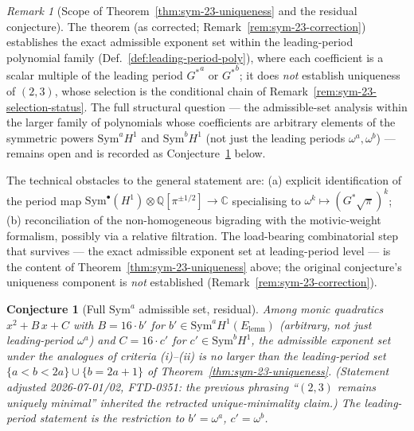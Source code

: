 \documentclass[11pt]{article}
\newtheorem{conjecture}[theorem]{Conjecture}
\theoremstyle{definition}
\theoremstyle{remark}
\newtheorem*{remark}{Remark}
\newcommand{\Gs}{G^{*}}
\newcommand{\Q}{\mathbb{Q}}
\newcommand{\C}{\mathbb{C}}
\begin{document}
\begin{remark}[Scope of Theorem~\ref{thm:sym-23-uniqueness} and the residual conjecture]
\label{rem:sym-thm-scope}
The theorem (as corrected; Remark~\ref{rem:sym-23-correction})
establishes the exact admissible exponent set within the
leading-period polynomial family (Def.~\ref{def:leading-period-poly}),
where each coefficient is a scalar multiple of the leading period
${\Gs}^{a}$ or ${\Gs}^{b}$; it does \emph{not} establish uniqueness of
$(2, 3)$, whose selection is the conditional chain of
Remark~\ref{rem:sym-23-selection-status}. The full structural
question --- the admissible-set analysis within the larger family of
polynomials whose coefficients are arbitrary elements of the symmetric
powers $\mathrm{Sym}^{a} H^{1}$ and $\mathrm{Sym}^{b} H^{1}$ (not just
the leading periods $\omega^{a}, \omega^{b}$) --- remains open and is
recorded as Conjecture~\ref{conj:sym-general} below.

The technical obstacles to the general statement are:
(a) explicit identification of the period map
$\mathrm{Sym}^{\bullet}(H^{1}) \otimes \Q[\pi^{\pm 1/2}] \to \C$
specialising to $\omega^{k} \mapsto (\Gs\sqrt\pi)^{k}$;
(b) reconciliation of the non-homogeneous bigrading with the
motivic-weight formalism, possibly via a relative filtration.
The load-bearing combinatorial step that survives --- the exact
admissible exponent set at leading-period level --- is the content of
Theorem~\ref{thm:sym-23-uniqueness} above; the original conjecture's
uniqueness component is \emph{not} established
(Remark~\ref{rem:sym-23-correction}).
\end{remark}

\begin{conjecture}[Full $\mathrm{Sym}^{a}$ admissible set, residual]\label{conj:sym-general}
Among monic quadratics $x^{2} + B\,x + C$ with $B = 16 \cdot b'$ for
$b' \in \mathrm{Sym}^{a} H^{1}(E_{\mathrm{lemn}})$ (arbitrary, not just
leading-period $\omega^{a}$) and $C = 16 \cdot c'$ for
$c' \in \mathrm{Sym}^{b} H^{1}$, the admissible exponent set under the
analogues of criteria \textup{(i)}--\textup{(ii)} is no larger than the
leading-period set
$\{a < b < 2a\} \cup \{b = 2a + 1\}$ of
Theorem~\ref{thm:sym-23-uniqueness}. (Statement adjusted 2026-07-01/02,
FTD-0351: the previous phrasing ``$(2, 3)$ remains uniquely minimal''
inherited the retracted unique-minimality claim.) The leading-period
statement is the restriction to $b' = \omega^{a}$, $c' = \omega^{b}$.
\end{conjecture}
\end{document}
